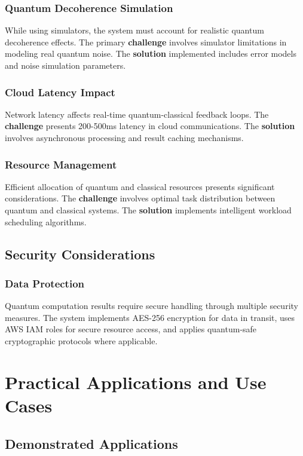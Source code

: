 \documentclass[onecolumn]{IEEEtran}
\begin{document}
\subsubsection{Quantum Decoherence Simulation}
While using simulators, the system must account for realistic quantum decoherence effects. The primary \textbf{challenge} involves simulator limitations in modeling real quantum noise. The \textbf{solution} implemented includes error models and noise simulation parameters.

\subsubsection{Cloud Latency Impact}
Network latency affects real-time quantum-classical feedback loops. The \textbf{challenge} presents 200-500ms latency in cloud communications. The \textbf{solution} involves asynchronous processing and result caching mechanisms.

\subsubsection{Resource Management}
Efficient allocation of quantum and classical resources presents significant considerations. The \textbf{challenge} involves optimal task distribution between quantum and classical systems. The \textbf{solution} implements intelligent workload scheduling algorithms.

\subsection{Security Considerations}

\subsubsection{Data Protection}
Quantum computation results require secure handling through multiple security measures. The system implements AES-256 encryption for data in transit, uses AWS IAM roles for secure resource access, and applies quantum-safe cryptographic protocols where applicable.

\section{Practical Applications and Use Cases}

\subsection{Demonstrated Applications}
\end{document}

